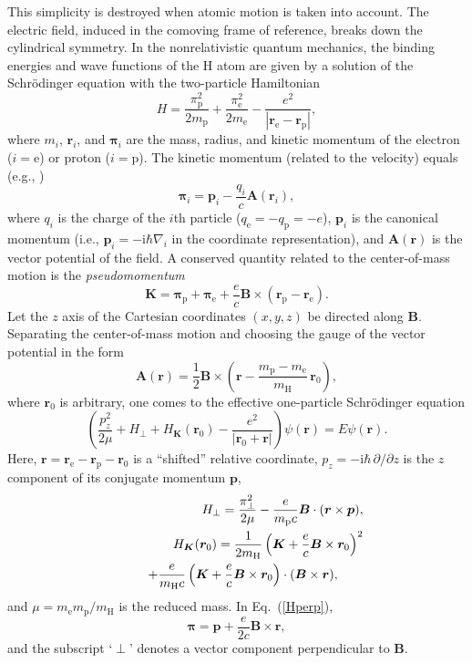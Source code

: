 \documentclass{emulateapj}
\newcommand{\beq}{\begin{equation}}
\newcommand{\eeq}{\end{equation}}
\newcommand{\bea}{\begin{eqnarray}}
\newcommand{\eea}{\end{eqnarray}}
\newcommand{\req}[1]{Eq.\ (\ref{#1})}
\newcommand{\mel}{m_\mathrm{e}}
\newcommand{\mpr}{m_\mathrm{p}}
\newcommand{\mH}{m_\mathrm{H}}
\begin{document}
This simplicity is destroyed when atomic motion is taken into
account. 
The electric field, induced in the comoving 
frame of reference, breaks down the cylindrical symmetry.
In the nonrelativistic quantum mechanics, 
the binding energies and wave functions of the H atom are given 
by a solution of the Schr\"odinger equation with the 
two-particle Hamiltonian
\beq
  H = \frac{\pi_\mathrm{p}^2}{2{\mpr}} 
   + \frac{\pi_\mathrm{e}^2}{2\mel}
   - \frac{e^2}{|\bm{r}_\mathrm{e}-\bm{r}_\mathrm{p}|},
\eeq
where
$m_i$, $\bm{r}_i$, and $\bm{\pi}_i$
are the mass, radius, and kinetic momentum 
of the electron ($i=$e) or proton ($i=$p).
The kinetic momentum (related to the velocity) equals 
(e.g., \citealp{LaLi-QM})
\beq
   \bm{\pi}_i =
   \bm{p}_i -\frac{q_i}{c}\bm{A}(\bm{r}_i),
\label{pi_i}
\eeq
where $q_i$ is the charge of the $i$th particle
($q_\mathrm{e}=-q_\mathrm{p}=-e$),
$\bm{p}_i$ is the canonical momentum
(i.e., $\bm{p}_i=-\mathrm{i}\hbar\nabla_i$
in the coordinate representation), 
and $\bm{A}(\bm{r})$ is the vector potential of the field.
A conserved quantity related to the center-of-mass motion
is the \emph{pseudomomentum}
\beq
   \bm{K} = \bm{\pi}_\mathrm{p} + \bm{\pi}_\mathrm{e}
   +\frac{e}{c}\bm{B}\times(\bm{r}_\mathrm{p}-\bm{r}_\mathrm{e}).
\eeq
Let the $z$ axis of the Cartesian coordinates
$(x,y,z)$ be directed along $\bm{B}$.
Separating the center-of-mass motion
\citep*{GD,VDB92,P94}
and choosing the gauge of the vector potential in the form
\beq
   \bm{A}(\bm{r}) = \frac12 \bm{B} \times \left(\bm{r}
      - \frac{\mpr-\mel}{\mH}\, \bm{r}_0 \right),
\eeq
where $\bm{r}_0$ is arbitrary,
one comes to the effective one-particle Schr\"odinger equation
\beq
   \left( \frac{p_z^2}{2\mu}
   + H_\perp + H_{\bm{K}}(\bm{r}_0)
    - \frac{e^2}{|\bm{r}_0+\bm{r}|} \right)
   \psi(\bm{r}) = E \psi(\bm{r}).
\label{Schr}
\eeq
Here, $\bm{r}=\bm{r}_\mathrm{e}-\bm{r}_\mathrm{p}-\bm{r}_0$
is a ``shifted'' relative coordinate,
$p_z=-\mathrm{i}\hbar\,\partial/\partial z$ 
is the $z$ component of its conjugate momentum $\bm{p}$,
\bea&&
   H_\perp = \frac{\pi_\perp^2}{2\mu} 
   - \frac{e}{\mpr c} \bm{B}\cdot(\bm{r}\times\bm{p}),
\label{Hperp}
\\&&
   H_{\bm{K}}(\bm{r}_0) = \frac{1}{2\mH}
      \left(\bm{K}+\frac{e}{c}\bm{B}\times\bm{r}_0\right)^2
 \nonumber\\&&\hspace*{2em}
      + \frac{e}{\mH c}
      \left(\bm{K}+\frac{e}{c}\bm{B}\times\bm{r}_0\right)
      \cdot(\bm{B}\times\bm{r}),
\hspace*{2em}
\eea
and $\mu=\mel\mpr/\mH$ is the reduced mass.
In \req{Hperp},
\beq
   \bm{\pi} = \bm{p}+\frac{e}{2c}\bm{B}\times\bm{r},
\label{pi}
\eeq
and the subscript `$\perp$' denotes a vector component
perpendicular to $\bm{B}$.
\end{document}
